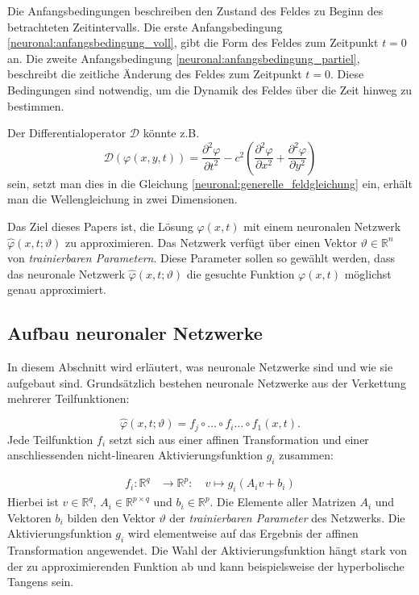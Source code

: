 Die Anfangsbedingungen beschreiben den Zustand des Feldes zu Beginn des betrachteten Zeitintervalls.
Die erste Anfangsbedingung \eqref{neuronal:anfangsbedingung_voll}, gibt die Form des Feldes zum Zeitpunkt $t = 0$ an.
Die zweite Anfangsbedingung \eqref{neuronal:anfangsbedingung_partiel}, beschreibt die zeitliche Änderung des Feldes zum Zeitpunkt $t = 0$.
Diese Bedingungen sind notwendig, um die Dynamik des Feldes über die Zeit hinweg zu bestimmen.

Der Differentialoperator $\mathcal{D}$ könnte z.B. 
\begin{equation}
    \mathcal{D}(\varphi(x, y, t)) = \frac{\partial^2 \varphi}{\partial t^2} - c^2 \left( \frac{\partial^2 \varphi}{\partial x^2} + \frac{\partial^2 \varphi}{\partial y^2} \right)
    \label{neuronal:bsp_differentialoperator}
\end{equation}
sein, setzt man dies in die Gleichung \eqref{neuronal:generelle_feldgleichung} ein, erhält man die Wellengleichung in zwei Dimensionen.

Das Ziel dieses Papers ist, die Lösung $\varphi(x, t)$ mit einem neuronalen Netzwerk $\hat{\varphi}(x, t; \vartheta)$ zu approximieren.
Das Netzwerk verfügt über einen Vektor \( \vartheta \in \mathbb{R}^n \) von \emph{trainierbaren Parametern}.
Diese Parameter sollen so gewählt werden, dass das neuronale Netzwerk $\hat{\varphi}(x, t; \vartheta)$ die gesuchte Funktion $\varphi(x, t)$ möglichst genau approximiert.

\subsection{Aufbau neuronaler Netzwerke}\label{neuronal:subsection:struktur_nn}
In diesem Abschnitt wird erläutert, was neuronale Netzwerke sind und wie sie aufgebaut sind.
Grundsätzlich bestehen neuronale Netzwerke aus der Verkettung mehrerer Teilfunktionen:

\begin{equation}
    \hat{\varphi}(x, t; \vartheta) = f_j \circ \ldots \circ f_i \ldots \circ f_1(x, t).
    \label{neuronal:nn_ausformuliert}
\end{equation}
Jede Teilfunktion \( f_i \) setzt sich aus einer affinen Transformation und einer anschliessenden nicht-linearen Aktivierungsfunktion \( g_i \) zusammen:

\begin{align*}
    f_i\colon \mathbb{R}^q & \longrightarrow \mathbb{R}^p \colon \quad v \longmapsto g_i(A_i v + b_i)
\end{align*}
Hierbei ist \( v \in \mathbb{R}^q \), \( A_i \in \mathbb{R}^{p \times q} \) und \( b_i \in \mathbb{R}^p \). 
Die Elemente aller Matrizen \( A_i \) und Vektoren \( b_i \) bilden den Vektor \( \vartheta \) der \emph{trainierbaren Parameter} des Netzwerks.
Die Aktivierungsfunktion \( g_i \) wird elementweise auf das Ergebnis der affinen Transformation angewendet.
Die Wahl der Aktivierungsfunktion hängt stark von der zu approximierenden Funktion ab und kann beispielsweise der hyperbolische Tangens sein.

